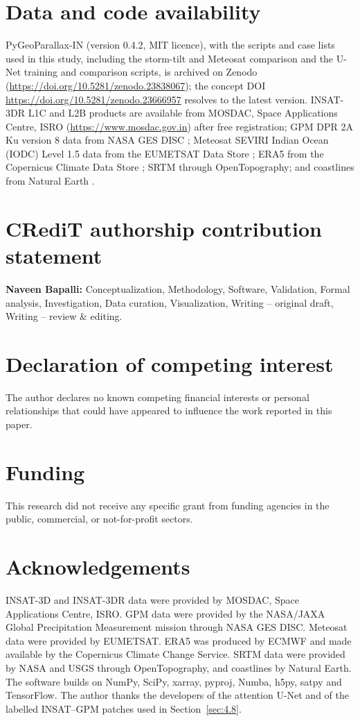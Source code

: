 \documentclass[preprint,12pt,authoryear]{elsarticle}
\begin{document}
\section*{Data and code availability}
PyGeoParallax-IN (version 0.4.2, MIT licence), with the scripts and case lists used in this study, including the storm-tilt and Meteosat comparison and the U-Net training and comparison scripts, is archived on Zenodo \citep{pygeoparallax} (\url{https://doi.org/10.5281/zenodo.23838067}); the concept DOI \url{https://doi.org/10.5281/zenodo.23666957} resolves to the latest version. INSAT-3DR L1C and L2B products are available from MOSDAC, Space Applications Centre, ISRO (\url{https://www.mosdac.gov.in}) after free registration; GPM DPR 2A Ku version 8 data from NASA GES DISC \citep{gpm2aku_v08}; Meteosat SEVIRI Indian Ocean (IODC) Level 1.5 data from the EUMETSAT Data Store \citep{eumetsat_iodc}; ERA5 from the Copernicus Climate Data Store \citep{c3s2018}; SRTM \citep{farr2007} through OpenTopography; and coastlines from Natural Earth \citep{naturalearth}.

\section*{CRediT authorship contribution statement}
\textbf{Naveen Bapalli:} Conceptualization, Methodology, Software, Validation, Formal analysis, Investigation, Data curation, Visualization, Writing -- original draft, Writing -- review \& editing.

\section*{Declaration of competing interest}
The author declares no known competing financial interests or personal relationships that could have appeared to influence the work reported in this paper.

\section*{Funding}
This research did not receive any specific grant from funding agencies in the public, commercial, or not-for-profit sectors.

\section*{Acknowledgements}
INSAT-3D and INSAT-3DR data were provided by MOSDAC, Space Applications Centre, ISRO. GPM data were provided by the NASA/JAXA Global Precipitation Measurement mission through NASA GES DISC. Meteosat data were provided by EUMETSAT. ERA5 was produced by ECMWF and made available by the Copernicus Climate Change Service. SRTM data were provided by NASA and USGS through OpenTopography, and coastlines by Natural Earth. The software builds on NumPy, SciPy, xarray, pyproj, Numba, h5py, satpy and TensorFlow. The author thanks the developers of the attention U-Net and of the labelled INSAT--GPM patches used in Section~\ref{sec:4.8}.
\end{document}

